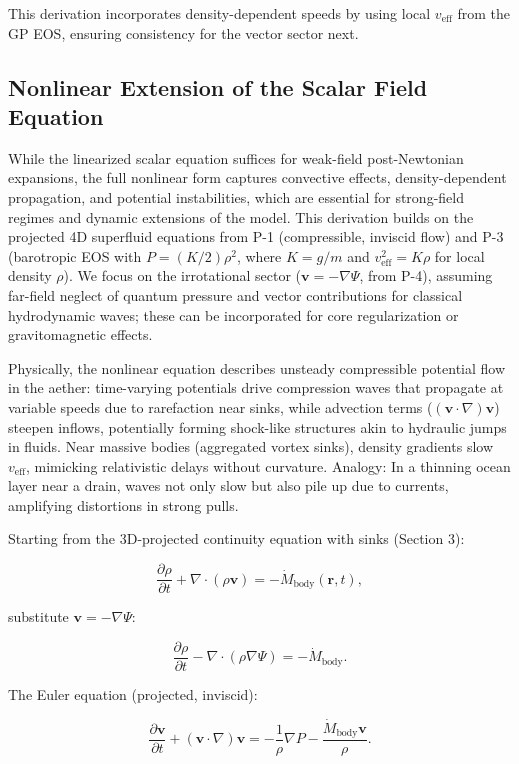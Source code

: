 \documentclass{article}
\begin{document}
This derivation incorporates density-dependent speeds by using local $v_{\text{eff}}$ from the GP EOS, ensuring consistency for the vector sector next.

\subsection{Nonlinear Extension of the Scalar Field Equation}

While the linearized scalar equation suffices for weak-field post-Newtonian expansions, the full nonlinear form captures convective effects, density-dependent propagation, and potential instabilities, which are essential for strong-field regimes and dynamic extensions of the model. This derivation builds on the projected 4D superfluid equations from P-1 (compressible, inviscid flow) and P-3 (barotropic EOS with $P = (K/2) \rho^2$, where $K = g/m$ and $v_{\text{eff}}^2 = K \rho$ for local density $\rho$). We focus on the irrotational sector ($\mathbf{v} = -\nabla \Psi$, from P-4), assuming far-field neglect of quantum pressure and vector contributions for classical hydrodynamic waves; these can be incorporated for core regularization or gravitomagnetic effects.

Physically, the nonlinear equation describes unsteady compressible potential flow in the aether: time-varying potentials drive compression waves that propagate at variable speeds due to rarefaction near sinks, while advection terms ($( \mathbf{v} \cdot \nabla ) \mathbf{v}$) steepen inflows, potentially forming shock-like structures akin to hydraulic jumps in fluids. Near massive bodies (aggregated vortex sinks), density gradients slow $v_{\text{eff}}$, mimicking relativistic delays without curvature. Analogy: In a thinning ocean layer near a drain, waves not only slow but also pile up due to currents, amplifying distortions in strong pulls.

Starting from the 3D-projected continuity equation with sinks (Section 3):

\[
\frac{\partial \rho}{\partial t} + \nabla \cdot (\rho \mathbf{v}) = -\dot{M}_{\text{body}}(\mathbf{r}, t),
\]

substitute $\mathbf{v} = -\nabla \Psi$:

\[
\frac{\partial \rho}{\partial t} - \nabla \cdot (\rho \nabla \Psi) = -\dot{M}_{\text{body}}.
\]

The Euler equation (projected, inviscid):

\[
\frac{\partial \mathbf{v}}{\partial t} + (\mathbf{v} \cdot \nabla) \mathbf{v} = -\frac{1}{\rho} \nabla P - \frac{\dot{M}_{\text{body}} \mathbf{v}}{\rho}.
\]
\end{document}

